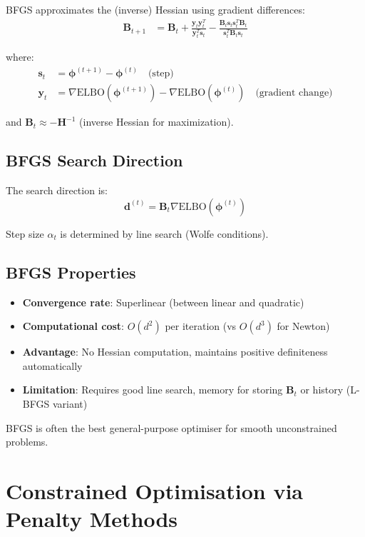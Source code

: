 \documentclass[11pt]{article}
\newcommand{\ELBO}{\text{ELBO}}
\begin{document}
BFGS approximates the (inverse) Hessian using gradient differences:
\begin{align}
\bm{B}_{t+1} &= \bm{B}_t + \frac{\bm{y}_t \bm{y}_t^T}{\bm{y}_t^T \bm{s}_t} - \frac{\bm{B}_t \bm{s}_t \bm{s}_t^T \bm{B}_t}{\bm{s}_t^T \bm{B}_t \bm{s}_t}
\end{align}

where:
\begin{align}
\bm{s}_t &= \bm{\phi}^{(t+1)} - \bm{\phi}^{(t)} \quad \text{(step)}\\
\bm{y}_t &= \nabla \ELBO(\bm{\phi}^{(t+1)}) - \nabla \ELBO(\bm{\phi}^{(t)}) \quad \text{(gradient change)}
\end{align}

and $\bm{B}_t \approx -\bm{H}^{-1}$ (inverse Hessian for maximization).

\subsection{BFGS Search Direction}

The search direction is:
\begin{equation}
\bm{d}^{(t)} = \bm{B}_t \nabla \ELBO(\bm{\phi}^{(t)})
\end{equation}

Step size $\alpha_t$ is determined by line search (Wolfe conditions).

\subsection{BFGS Properties}

\begin{itemize}
\item \textbf{Convergence rate}: Superlinear (between linear and quadratic)
\item \textbf{Computational cost}: $O(d^2)$ per iteration (vs $O(d^3)$ for Newton)
\item \textbf{Advantage}: No Hessian computation, maintains positive definiteness automatically
\item \textbf{Limitation}: Requires good line search, memory for storing $\bm{B}_t$ or history (L-BFGS variant)
\end{itemize}

BFGS is often the best general-purpose optimiser for smooth unconstrained problems.

\section{Constrained Optimisation via Penalty Methods}
\end{document}
